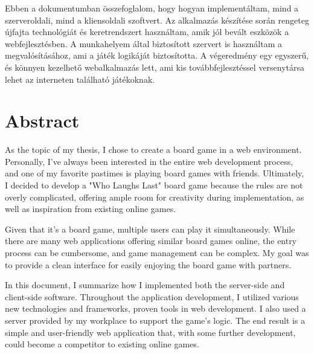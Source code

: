 \documentclass[a4paper,twoside]{article}
\begin{document}
Ebben a dokumentumban összefoglalom, hogy hogyan implementáltam, mind a szerveroldali,
mind a kliensoldali szoftvert. Az alkalmazás készítése során rengeteg újfajta technológiát és
keretrendszert használtam, amik jól bevált eszközök a webfejlesztésben. A munkahelyem
által biztosított szervert is használtam a megvalósításához, ami a játék logikáját biztosította. A
végeredmény egy egyszerű, és könnyen kezelhető webalkalmazás lett, ami kis
továbbfejlesztéssel versenytársa lehet az interneten található játékoknak.


\newpage
\section{Abstract}
As the topic of my thesis, I chose to create a board game in a web environment. Personally, I've always been interested in the entire web development process, and one of my favorite pastimes is playing board games with friends. Ultimately, I decided to develop a "Who Laughs Last" board game because the rules are not overly complicated, offering ample room for creativity during implementation, as well as inspiration from existing online games.

Given that it's a board game, multiple users can play it simultaneously. While there are many web applications offering similar board games online, the entry process can be cumbersome, and game management can be complex. My goal was to provide a clean interface for easily enjoying the board game with partners.

In this document, I summarize how I implemented both the server-side and client-side software. Throughout the application development, I utilized various new technologies and frameworks, proven tools in web development. I also used a server provided by my workplace to support the game's logic. The end result is a simple and user-friendly web application that, with some further development, could become a competitor to existing online games.
\newpage
\end{document}
